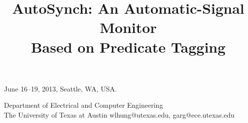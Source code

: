 \documentclass{sigplanconf}
\begin{document}
 {June 16--19, 2013, Seattle, WA, USA.}


\title{AutoSynch: An Automatic-Signal Monitor \\ Based on Predicate Tagging}

           {Department of Electrical and Computer Engineering \\
           The University of Texas at Austin}
           {wlhung@utexas.edu, garg@ece.utexas.edu}
\end{document}

